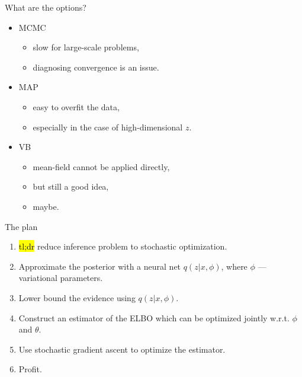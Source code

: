 \documentclass[unicode,11pt]{beamer}
\begin{document}
\begin{frame}{What are the options?}
  \begin{itemize}
  \item MCMC
    \begin{itemize}
    \item slow for large-scale problems,
    \item diagnosing convergence is an issue.
    \end{itemize}
  \item MAP
    \begin{itemize}
    \item easy to overfit the data,
    \item especially in the case of high-dimensional $z$.
    \end{itemize}
  \item VB
    \begin{itemize}
    \item mean-field cannot be applied directly,
    \item but still a good idea,
    \item maybe.
    \end{itemize}
  \end{itemize}
\end{frame}


\begin{frame}{The plan}
  \begin{enumerate}
  \item[] \hl{tl;dr} reduce inference problem to stochastic optimization.
    \vspace{1em}
  \item Approximate the posterior with a neural net
    $q(z|x, \phi)$, where $\phi$ --- variational parameters.
  \item Lower bound the evidence using $q(z|x, \phi)$.
  \item Construct an estimator of the ELBO which can be
    optimized jointly w.r.t. $\phi$ and $\theta$.
  \item Use stochastic gradient ascent to optimize the estimator.
  \item Profit.
  \end{enumerate}
\end{frame}
\end{document}
